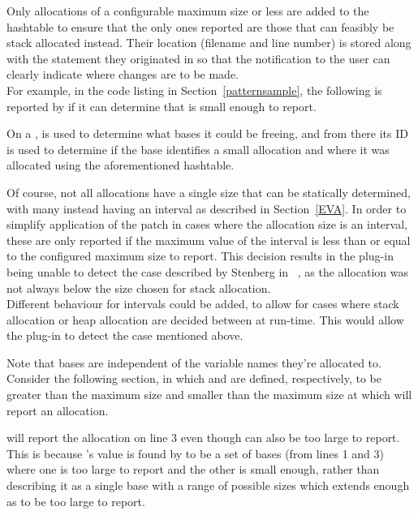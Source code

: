Only allocations of a configurable maximum size or less are added to the hashtable to ensure that the only ones reported are those that can feasibly be stack allocated instead. Their location (filename and line number) is stored along with the statement they originated in so that the notification to the user can clearly indicate where changes are to be made.\\
For example, in the code listing in Section~\ref{patternsample}, the following is reported by  if it can determine that  is small enough to report.



On a \free{},  is used to determine what bases it could be freeing, and from there its ID is used to determine if the base identifies a small allocation and where it was allocated using the aforementioned hashtable.

Of course, not all allocations have a single size that can be statically determined, with many instead having an interval as described in Section~\ref{EVA}. In order to simplify application of the patch in cases where the allocation size is an interval, these are only reported if the maximum value of the interval is less than or equal to the configured maximum size to report. This decision results in the plug-in being unable to detect the case described by Stenberg in ~\cite{curlmalloc}, as the allocation was not always below the size chosen for stack allocation.\\
Different behaviour for intervals could be added, to allow for cases where stack allocation or heap allocation are decided between at run-time. This would allow the plug-in to detect the case mentioned above.

Note that bases are independent of the variable names they're allocated to. Consider the following section, in which  and  are defined, respectively, to be greater than the maximum size and smaller than the maximum size at which  will report an allocation.



 will report the allocation on line 3 even though  can also be too large to report. This is because 's value is found by  to be a set of bases (from lines 1 and 3) where one is too large to report and the other is small enough, rather than describing it as a single base with a range of possible sizes which extends enough as to be too large to report.

